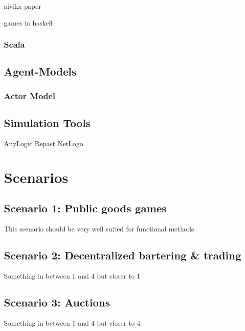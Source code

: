 \documentclass{article}
\begin{document}
\cite{Nilsson2002}
\cite{Nilsson_2014}
\cite{Nilsson_2003}
\cite{Hudak2003}
\cite{Courtney2003}

\cite{Sulzmann_2007}

\cite{bauer_adaptation_2011}

\cite{Jankovic_2007}


aivika paper

games in haskell

\subsubsection{Scala}

\subsection{Agent-Models}
\subsubsection{Actor Model}
\cite{Poggi_2015}
\cite{Parker_2011}
\cite{DiStefano_2007}
\cite{Varela_2004}
\cite{DiStefano_2005}

\cite{Hewitt_1973}
 \cite{Greif_1975}
 \cite{Clinger_1981}
 \cite{Agha_1986}
 \cite{Agha_1997}
 \cite{Hewitt_2007}
 \cite{Hewitt_2010}
 \cite{Agha_2004}
\subsection{Simulation Tools}
AnyLogic
Repast
NetLogo

\section{Scenarios}
\subsection{Scenario 1: Public goods games}
This scenario should be very well suited for functional methods

\subsection{Scenario 2: Decentralized bartering \& trading}
Something in between 1 and 4 but closer to 1

\subsection{Scenario 3: Auctions}
Something in between 1 and 4 but closer to 4
\end{document}
